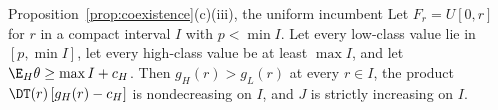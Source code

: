 
\begin{named}{Proposition~\ref{prop:coexistence}(c)(iii), the uniform incumbent}
Let \(F_r=U[0,r]\) for \(r\) in a compact interval \(I\) with \(p<\min I\). Let every low-class value lie in
\([p,\min I]\), let every high-class value be at least \(\max I\), and let \(\E_H\theta\ge\max I+c_H\). Then
\(g_H(r)>g_L(r)\) at every \(r\in I\), the product \(\DT(r)\,[g_H(r)-c_H]\) is nondecreasing on \(I\), and \(J\) is
strictly increasing on \(I\).
\end{named}

